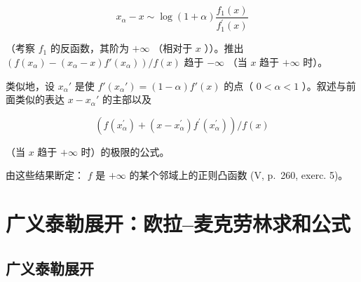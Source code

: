 \[
x _ {\alpha} - x \sim \log (1 + \alpha) \frac {f _ {1} (x)}{f _ {1} ^ {\prime} (x)}
\]

（考察 \(f_{1}\) 的反函数，其阶为 \(+\infty\) （相对于 \(x\) ））。推出 \(\left(f(x_{\alpha}) - (x_{\alpha} - x)f'(x_{\alpha})\right) / f(x)\) 趋于 \(-\infty\) （当 \(x\) 趋于 \(+\infty\) 时）。

类似地，设 \(x_{\alpha}'\) 是使 \(f'(x_{\alpha}') = (1 - \alpha)f'(x)\) 的点（ \(0 < \alpha < 1\) ）。叙述与前面类似的表达 \(x - x_{\alpha}'\) 的主部以及

\[
\left(f (x _ {\alpha} ^ {\prime}) + (x - x _ {\alpha} ^ {\prime}) f ^ {\prime} (x _ {\alpha} ^ {\prime})\right) / f (x)
\]

（当 \(x\) 趋于 \(+\infty\) 时）的极限的公式。

由这些结果断定： \(f\) 是 \(+\infty\) 的某个邻域上的正则凸函数 (V, p.~260, exerc. 5)。

\makeatletter
\gdef\@chapapp{\chaptername}
\makeatother
\renewcommand{\thechapter}{\chinese{chapter}}
\renewcommand{\thesection}{\S\arabic{section}}
\setcounter{chapter}{5}
\chapter{广义泰勒展开：欧拉–麦克劳林求和公式}

\section{广义泰勒展开}
